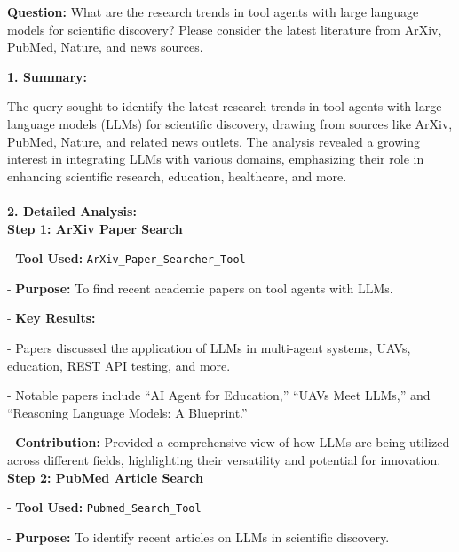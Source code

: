 

\begin{querybox}
\textbf{Question:}
What are the research trends in tool agents with large language models for scientific discovery? Please consider the latest literature from ArXiv, PubMed, Nature, and news sources.
\end{querybox}


\begin{answerbox}
\textbf{1. Summary:}

The query sought to identify the latest research trends in tool agents with large language models (LLMs) for scientific discovery, drawing from sources like ArXiv, PubMed, Nature, and related news outlets. The analysis revealed a growing interest in integrating LLMs with various domains, emphasizing their role in enhancing scientific research, education, healthcare, and more.
\\\\
\textbf{2. Detailed Analysis:}\\

\quad \textbf{Step 1: ArXiv Paper Search}

\quad\quad - \textbf{Tool Used:} \texttt{ArXiv\_Paper\_Searcher\_Tool} 

\quad\quad - \textbf{Purpose:} To find recent academic papers on tool agents with LLMs.

\quad\quad- \textbf{Key Results:}

\quad\quad\quad  - Papers discussed the application of LLMs in multi-agent systems, UAVs, education, REST API testing, and more.
  
\quad\quad\quad - Notable papers include ``AI Agent for Education,'' ``UAVs Meet LLMs,'' and ``Reasoning Language Models: A Blueprint.''
  
\quad - \textbf{Contribution:} Provided a comprehensive view of how LLMs are being utilized across different fields, highlighting their versatility and potential for innovation. \\

\quad \textbf{Step 2: PubMed Article Search}

\quad\quad - \textbf{Tool Used:} \texttt{Pubmed\_Search\_Tool}

\quad\quad- \textbf{Purpose:} To identify recent articles on LLMs in scientific discovery.


\end{answerbox}
